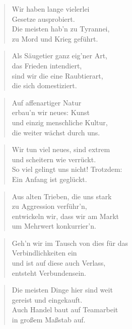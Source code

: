\documentclass[10pt,a4paper]{article}
\begin{document}
\begin{multicols}{2}
\begin{verse}
Wir haben lange vielerlei \\
Gesetze ausprobiert. \\
Die meisten hab’n zu Tyrannei, \\
zu Mord und Krieg geführt. \\
\end{verse}

\begin{verse}
Als Säugetier ganz eig’ner Art, \\
das Frieden intendiert, \\
sind wir die eine Raubtierart, \\
die sich domestiziert. \\
\end{verse}

\begin{verse}
Auf affenartiger Natur \\
erbau’n wir neues: Kunst \\
und einzig menschliche Kultur, \\
die weiter wächst durch uns. \\
\end{verse}

\begin{verse}
Wir tun viel neues, sind extrem \\
und scheitern wie verrückt. \\
So viel gelingt uns nicht! Trotzdem: \\
Ein Anfang ist geglückt. \\
\end{verse}

\begin{verse}
Aus alten Trieben, die uns stark \\
zu Aggression verführ’n, \\
entwickeln wir, dass wir am Markt \\
um Mehrwert konkurrier’n. \\
\end{verse}

\begin{verse}
Geh’n wir im Tausch von dies für das \\
Verbindlichkeiten ein \\
und ist auf diese auch Verlass, \\
entsteht Verbundensein. \\
\end{verse}

\begin{verse}
Die meisten Dinge hier sind weit \\
gereist und eingekauft. \\
Auch Handel baut auf Teamarbeit \\
in großem Maßstab auf. \\
\end{verse}


\end{multicols}
\end{document}
